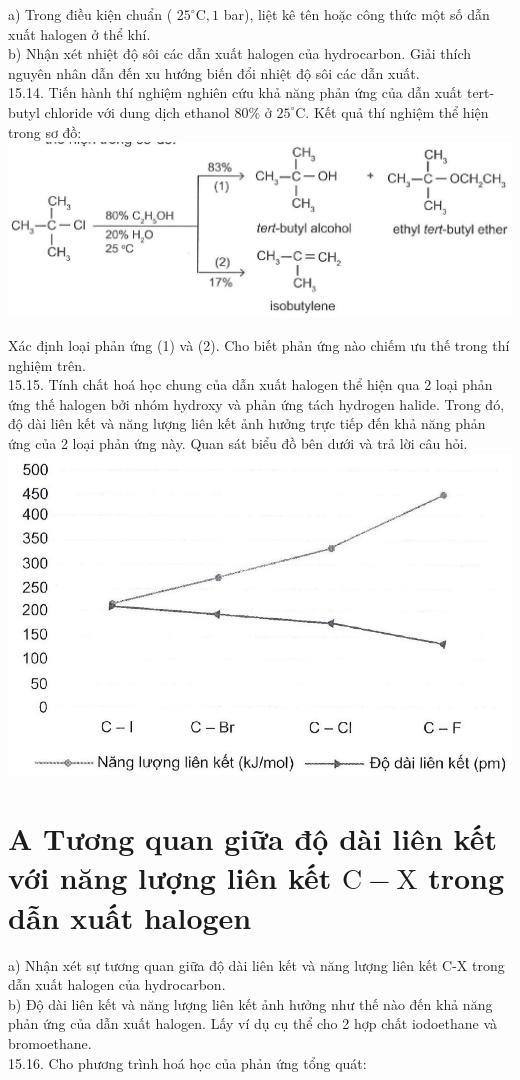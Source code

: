 \documentclass[10pt]{article}
\begin{document}
a) Trong điều kiện chuẩn ( $25^{\circ} \mathrm{C}, 1$ bar), liệt kê tên hoặc công thức một số dẫn xuất halogen ở thể khí.\\
b) Nhận xét nhiệt độ sôi các dẫn xuất halogen của hydrocarbon. Giải thích nguyên nhân dẫn đến xu hướng biến đổi nhiệt độ sôi các dẫn xuất.\\
15.14. Tiến hành thí nghiệm nghiên cứu khả năng phản ứng của dẫn xuất tert-butyl chloride với dung dịch ethanol $80 \%$ ở $25^{\circ} \mathrm{C}$. Kết quả thí nghiệm thể hiện trong sơ đồ:\\
\includegraphics[max width=\textwidth, center]{2025_10_23_ae7aef68fb3b41082d29g-34(1)}

Xác định loại phản ứng (1) và (2). Cho biết phản ứng nào chiếm ưu thế trong thí nghiệm trên.\\
15.15. Tính chất hoá học chung của dẫn xuất halogen thể hiện qua 2 loại phản ứng thế halogen bởi nhóm hydroxy và phản ứng tách hydrogen halide. Trong đó, độ dài liên kết và năng lượng liên kết ảnh hưởng trực tiếp đến khả năng phản ứng của 2 loại phản ứng này. Quan sát biểu đồ bên dưới và trả lời câu hỏi.\\
\includegraphics[max width=\textwidth, center]{2025_10_23_ae7aef68fb3b41082d29g-34(2)}

\section*{A Tương quan giữa độ dài liên kết với năng lượng liên kết $\mathrm{C}-\mathrm{X}$ trong dẫn xuất halogen}
a) Nhận xét sự tương quan giữa độ dài liên kết và năng lượng liên kết C-X trong dẫn xuất halogen của hydrocarbon.\\
b) Độ dài liên kết và năng lượng liên kết ảnh hưởng như thế nào đến khả năng phản ứng của dẫn xuất halogen. Lấy ví dụ cụ thể cho 2 hợp chất iodoethane và bromoethane.\\
15.16. Cho phương trình hoá học của phản ứng tổng quát:
\end{document}
